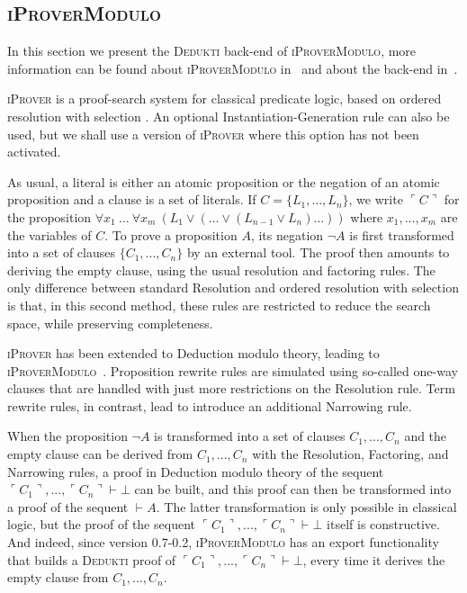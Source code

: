 \documentclass[english]{lipics}
\begin{document}
\subsection{\textsc{iProverModulo}}

In this section we present the \textsc{Dedukti} back-end of
\textsc{iProverModulo}, more information can be found about
\textsc{iProverModulo} in~\cite{burel11experimenting} and about the
back-end in~\cite{Burel13}.

\textsc{iProver} \cite{korovin08iprover} is a proof-search
system for classical predicate logic, based on ordered resolution with
selection \cite{bachmair01resolution}.  An optional
Instantiation-Generation rule \cite{ganzinger03new} can also be used,
but we shall use a version of \textsc{iProver} where this option
has not been activated.

As usual, a literal is either an atomic proposition or the negation of
an atomic proposition and a clause is a set of literals.  If $C =
\{L_1,\dots,L_n\}$, we write $\ulcorner C \urcorner$ for the
proposition $\forall x_1~\dots~\forall x_m~(L_1\vee (\dots
\vee(L_{n-1} \vee L_n)\dots))$ where $x_1, \dots, x_m$ are the
variables of $C$.  To prove a proposition $A$, its negation $\neg A$ is
first transformed into a set of clauses $\{C_1, ..., C_n\}$ by an external
tool. The proof then amounts to deriving the
empty clause, using the usual resolution and
factoring rules. The only difference between standard Resolution and
ordered resolution with selection is that, in this second method,
these rules are restricted to reduce the search space, while preserving
completeness.

\textsc{iProver} has been extended to Deduction modulo theory, leading
to \textsc{iProverModulo}~\cite{burel11experimenting}.  Proposition
rewrite rules are simulated using so-called one-way clauses
\cite{polar} that are handled with just more restrictions on the
Resolution rule.  Term rewrite rules, in contrast, lead to introduce
an additional Narrowing rule.

When the proposition $\neg A$ is transformed into a set of clauses
$C_1, ..., C_n$ and the empty clause can be derived from $C_1, ...,
C_n$ with the Resolution, Factoring, and Narrowing rules, a proof in
Deduction modulo theory of the sequent $\ulcorner C_1 \urcorner, ...,
\ulcorner C_n \urcorner \vdash \bot$ can be built, and this proof can
then be transformed into a proof of the sequent $\vdash A$. The latter
transformation is only possible in classical logic, but the proof of
the sequent $\ulcorner C_1 \urcorner, ..., \ulcorner C_n \urcorner
\vdash \bot$ itself is constructive. And indeed, since version
0.7-0.2, \textsc{iProverModulo} has an export functionality that
builds a \textsc{Dedukti} proof of $\ulcorner C_1 \urcorner, ...,
\ulcorner C_n \urcorner \vdash \bot$, every time it derives the empty
clause from $C_1, ..., C_n$.
\end{document}

